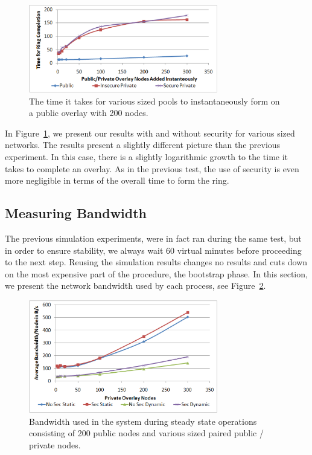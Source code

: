 \documentclass[conference]{IEEEtran}
\begin{document}
\begin{figure}[h]
\centering
\includegraphics[width=3.25in]{mass_join.eps}
\caption{The time it takes for various sized pools to instantaneously form
on a public overlay with 200 nodes.}
\label{fig:big_join}
\end{figure}

In Figure~\ref{fig:big_join}, we present our results with and without security
for various sized networks.  The results present a slightly different picture
than the previous experiment.  In this case, there is a slightly logarithmic
growth to the time it takes to complete an overlay.  As in the previous test,
the use of security is even more negligible in terms of the overall time to
form the ring.

\subsection{Measuring Bandwidth}
The previous simulation experiments, were in fact ran during the same test, but
in order to ensure stability, we always wait 60 virtual minutes before proceeding
to the next step.  Reusing the simulation results changes no results and cuts
down on the most expensive part of the procedure, the bootstrap phase.  In this
section, we present the network bandwidth used by each process, see
Figure~\ref{fig:bandwidth}.

\begin{figure}[h]
\centering
\includegraphics[width=3.25in]{bandwidth.eps}
\caption{Bandwidth used in the system during steady state operations consisting
of 200 public nodes and various sized paired public / private nodes.}
\label{fig:bandwidth}
\end{figure}
\end{document}
